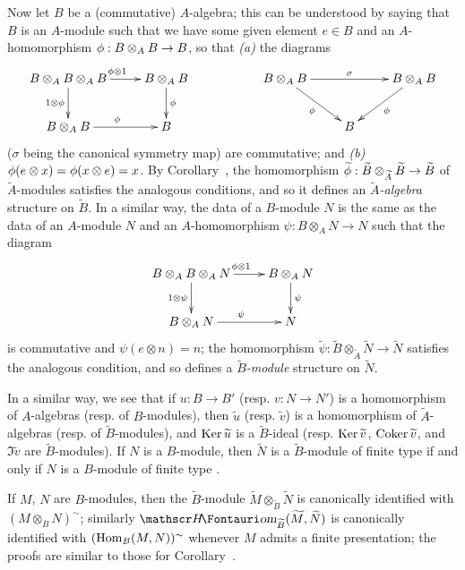 \begin{env}[1.3.13]
\label{1.1.3.13}
Now let $B$ be a (commutative) $A$-algebra; this can be understood by saying that $B$ is an $A$-module such that we have some given element $e\in B$ and an $A$-homomorphism $\vphi:B\otimes_A B\to B$, so that \emph{(a)} the diagrams
\[
  \xymatrix{
    B\otimes_A B\otimes_A B\ar[r]^{\vphi\otimes 1}\ar[d]_{1\otimes\vphi} &
    B\otimes_A B\ar[d]^\vphi & &
    B\otimes_A B\ar[rr]^\sigma\ar[rd]_\vphi & &
    B\otimes_A B\ar[dl]^\vphi\\
    B\otimes_A B\ar[r]^\vphi &
    B & & &
    B
  }
\]
($\sigma$ being the canonical symmetry map) are commutative; and \emph{(b)} $\phi(e\otimes x)=\phi(x\otimes e)=x$.
By Corollary~, the homomorphism $\widetilde{\vphi}:\widetilde{B}\otimes_{\widetilde{A}}\widetilde{B}\to\widetilde{B}$ of $\widetilde{A}$-modules satisfies the analogous conditions, and so it defines an \emph{$\widetilde{A}$-algebra} structure on $\widetilde{B}$.
In a similar way, the data of a $B$-module $N$ is the same as the data of an $A$-module $N$ and an $A$-homomorphism $\psi:B\otimes_A N\to N$ such that the diagram
\[
  \xymatrix{
    B\otimes_A B\otimes_A N\ar[r]^{\vphi\otimes 1}\ar[d]_{1\otimes\psi} &
    B\otimes_A N\ar[d]^\psi\\
    B\otimes_A N\ar[r]^\psi &
    N
  }
\]
is commutative and $\psi(e\otimes n)=n$;
the homomorphism $\widetilde{\psi}:\widetilde{B}\otimes_{\widetilde{A}}\widetilde{N}\to\widetilde{N}$ satisfies the analogous condition, and so defines a \emph{$\widetilde{B}$-module} structure on $\widetilde{N}$.

In a similar way, we see that if $u:B\to B'$ (resp. $v:N\to N'$) is a homomorphism of $A$-algebras (resp. of $B$-modules), then $\widetilde{u}$ (resp. $\widetilde{v}$) is a homomorphism of $\widetilde{A}$-algebras (resp. of $\widetilde{B}$-modules), and $\operatorname{Ker}\widetilde{u}$ is a $\widetilde{B}$-ideal (resp. $\operatorname{Ker}\widetilde{v}$, $\operatorname{Coker}\widetilde{v}$, and $\Im\widetilde{v}$ are $\widetilde{B}$-modules).
If $N$ is a $B$-module, then $\widetilde{N}$ is a $\widetilde{B}$-module of finite type if and only if $N$ is a $B$-module of finite type .

If $M$, $N$ are $B$-modules, then the $\widetilde{B}$-module $\widetilde{M}\otimes_{\widetilde{B}}\widetilde{N}$ is canonically identified with $(M\otimes_B N)^\sim$;
similarly $\shHom_{\widetilde{B}}(\widetilde{M},\widetilde{N})$ is canonically identified with $(\operatorname{Hom}_B(M,N))^\sim$ whenever $M$ admits a finite presentation;
the proofs are similar to those for Corollary~.


\end{env}
